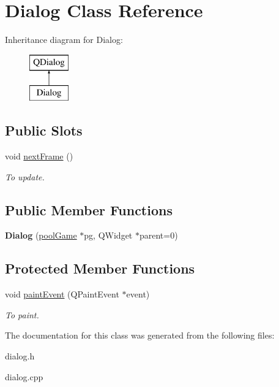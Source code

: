 \hypertarget{class_dialog}{}\section{Dialog Class Reference}
\label{class_dialog}
Inheritance diagram for Dialog\+:\begin{figure}[H]
\begin{center}
\leavevmode
\includegraphics[height=2.000000cm]{class_dialog}
\end{center}
\end{figure}
\subsection*{Public Slots}
\begin{DoxyCompactItemize}
\item 
\mbox{\label{class_dialog_a8bc4fe3b0cc12033369b49eab8751e14}} 
void \mbox{\hyperlink{class_dialog_a8bc4fe3b0cc12033369b49eab8751e14}{next\+Frame}} ()
\begin{DoxyCompactList}\small\item\em To update. \end{DoxyCompactList}\end{DoxyCompactItemize}
\subsection*{Public Member Functions}
\begin{DoxyCompactItemize}
\item 
\mbox{\label{class_dialog_a877ced4e29e3638b2f8925a954852ca0}} 
{\bfseries Dialog} (\mbox{\hyperlink{classpool_game}{pool\+Game}} $\ast$pg, Q\+Widget $\ast$parent=0)
\end{DoxyCompactItemize}
\subsection*{Protected Member Functions}
\begin{DoxyCompactItemize}
\item 
\mbox{\label{class_dialog_ac761f05fce616d76acf0612370b857ad}} 
void \mbox{\hyperlink{class_dialog_ac761f05fce616d76acf0612370b857ad}{paint\+Event}} (Q\+Paint\+Event $\ast$event)
\begin{DoxyCompactList}\small\item\em To paint. \end{DoxyCompactList}\end{DoxyCompactItemize}


The documentation for this class was generated from the following files\+:\begin{DoxyCompactItemize}
\item 
dialog.\+h\item 
dialog.\+cpp\end{DoxyCompactItemize}
